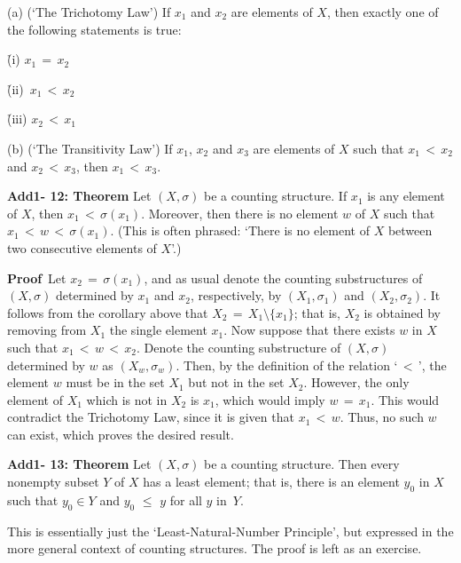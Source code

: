 \V

        (a) (`The Trichotomy Law') If $x_{1}$ and $x_{2}$ are elements of $X$, then exactly one of the following statements is true:

        \h (i)\,\,$x_{1} \,=\, x_{2}$

        \h (ii)\, $x_{1}\,<\,x_{2}$

        \h (iii) $x_{2}\,<\,x_{1}$

\V

        (b) (`The Transitivity Law') If $x_{1}$, $x_{2}$ and $x_{3}$ are elements of $X$ such that $x_{1}\,<\,x_{2}$ and $x_{2}\,<\,x_{3}$, then $x_{1}\,<\,x_{3}$.

\V
\V


        {\bf Add1- 12: Theorem} Let $(X,{\sigma})$ be a counting structure. If $x_{1}$ is any element of $X$, then $x_{1}\,<\,{\sigma}(x_{1})$.
    Moreover, then there is no element $w$ of $X$ such that $x_{1}\,<\,w\,<\,{\sigma}(x_{1})$.
    (This is often phrased: `There is no element of $X$ between two consecutive elements of $X$'.)

\V

        {\bf Proof}\,  Let $x_{2} \,=\, {\sigma}(x_{1})$, and as usual denote the counting substructures of $(X,{\sigma})$ determined by $x_{1}$ and $x_{2}$, respectively, by $(X_{1},{\sigma}_{1})$ and $(X_{2},{\sigma}_{2})$.
    It follows from the corollary above that $X_{2} \,=\, X_{1}{\setminus}\{x_{1}\}$; that is, $X_{2}$ is obtained by removing from $X_{1}$ the single element $x_{1}$.
    Now suppose that there exists $w$ in $X$ such that $x_{1}\,<\,w\,<\,x_{2}$.
    Denote the counting substructure of $(X,{\sigma})$ determined by $w$ as $(X_{w},{\sigma}_{w})$.
    Then, by the definition of the relation `$\,<\,$', the element $w$ must be in the set $X_{1}$ but not in the set $X_{2}$.
    However, the only element of $X_{1}$ which is not in $X_{2}$ is $x_{1}$, which would imply $w \,=\, x_{1}$.
    This would contradict the Trichotomy Law, since it is given that $x_{1}\,<\,w$.
    Thus, no such $w$ can exist, which proves the desired result.

\V


        {\bf Add1- 13: Theorem} Let $(X,{\sigma})$ be a counting structure. Then every nonempty subset $Y$ of $X$ has a least element;
    that is, there is an element $y_{0}$ in $X$ such that $y_{0}{\in}Y$ and $y_{0}\,\,{\leq}\,\,y$ for all $y$ in~$Y$.

\V

        This is essentially just the `Least-Natural-Number Principle',
    but expressed in the more general context of counting structures.
    The proof is left as an exercise.

